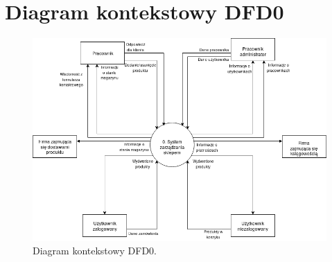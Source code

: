\documentclass[a4paper,11pt]{article}
\begin{document}
\section {Diagram kontekstowy DFD0}

\begin{figure}[ht]
\includegraphics[width=14cm]{Diagramy/DFD0.png}
\caption{Diagram kontekstowy DFD0.}
\centering
\end{figure}
\end{document}
